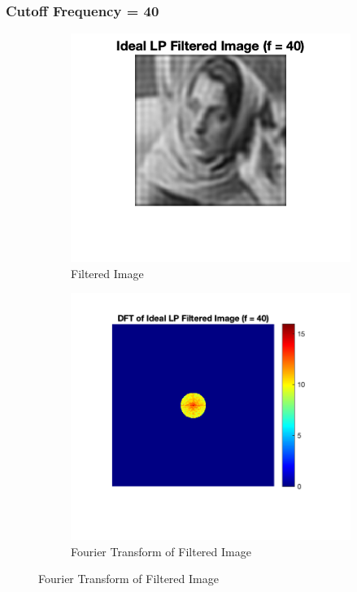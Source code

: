\documentclass[12pt]{article}
\begin{document}
\subsubsection*{Cutoff Frequency = 40}
\begin{figure}[H]
    \begin{subfigure}{.45\textwidth}
    \centering
      \includegraphics[width=1\linewidth]{../images/barbara_ideal_LPF_40.png}
      \caption{Filtered Image}
    \end{subfigure}
    \begin{subfigure}{.5\textwidth}
    \centering
      \includegraphics[width=1\linewidth]{../images/barbara_DFT_ideal_LPF_40.png}
      \caption{Fourier Transform of Filtered Image}
    \end{subfigure}
\end{figure}
\end{document}
